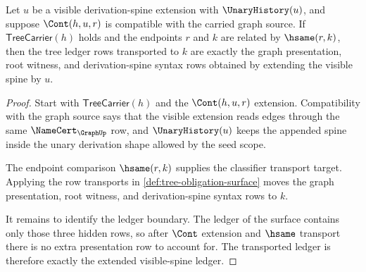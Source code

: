 \begin{theorem}\label{thm:tree-stability-ledger-obligation}
Let $u$ be a visible derivation-spine extension with $\UnaryHistory(u)$, and suppose $\Cont(h,u,r)$ is compatible with the carried graph source. If $\mathsf{TreeCarrier}(h)$ holds and the endpoints $r$ and $k$ are related by $\hsame(r,k)$, then the tree ledger rows transported to $k$ are exactly the graph presentation, root witness, and derivation-spine syntax rows obtained by extending the visible spine by $u$.
\end{theorem}
\begin{proof}
Start with $\mathsf{TreeCarrier}(h)$ and the $\Cont(h,u,r)$ extension. Compatibility with the graph source says that the visible extension reads edges through the same $\NameCert_{\GraphUp}$ row, and $\UnaryHistory(u)$ keeps the appended spine inside the unary derivation shape allowed by the seed scope.

The endpoint comparison $\hsame(r,k)$ supplies the classifier transport target. Applying the row transports in \autoref{def:tree-obligation-surface} moves the graph presentation, root witness, and derivation-spine syntax rows to $k$.

It remains to identify the ledger boundary. The ledger of the surface contains only those three hidden rows, so after $\Cont$ extension and $\hsame$ transport there is no extra presentation row to account for. The transported ledger is therefore exactly the extended visible-spine ledger.
\end{proof}

